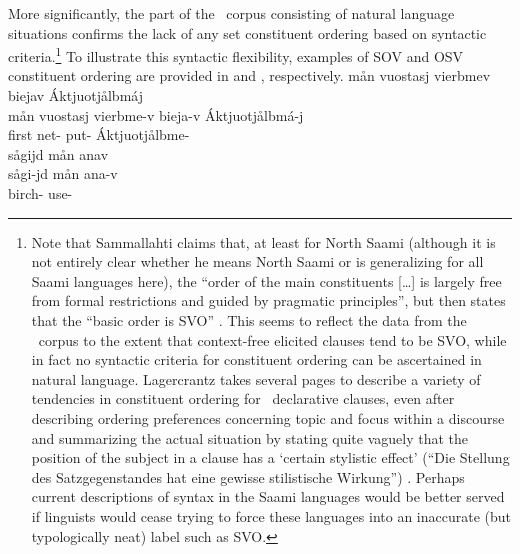 More significantly, the part of the \PS\ corpus consisting of natural language situations confirms the lack of any set constituent ordering based on syntactic criteria.\footnote{Note that Sammallahti claims that, at least for North Saami (although it is not entirely clear whether he means North Saami or is generalizing for all Saami languages here), the “order of the main constituents […] is largely free from formal restrictions and guided by pragmatic principles”, but then states that the “basic order is SVO” \citep[95]{Sammallahti1998}. This seems to reflect the data from the \PS\ corpus to the extent that context-free elicited clauses tend to be SVO, while in fact no syntactic criteria for constituent ordering can be ascertained in natural language. 
Lagercrantz takes several pages to describe a variety of tendencies in constituent ordering for \PS\ declarative clauses, even after describing ordering preferences concerning topic and focus within a discourse and summarizing the actual situation by stating quite vaguely that the position of the subject in a clause has a ‘certain stylistic effect’ (“Die Stellung des Satzgegenstandes hat eine gewisse stilistische Wirkung”) \citep[46]{Lagercrantz1926}. %
Perhaps current descriptions of syntax in the Saami languages would be better served if linguists %
would cease trying to force these languages into an inaccurate (but typologically neat) label such as SVO.} 
To illustrate this syntactic flexibility, examples of SOV and OSV %
constituent ordering are provided in  and , %
respectively.
\ea\label{deviantConstituentOrder1}
\glll	mån vuostasj vierbmev biejav Áktjuotjålbmáj \\
	mån vuostasj vierbme-v bieja-v Áktjuotjålbmá-j \\
	 first net- put- Áktjuotjålbme-\\\nopagebreak
{} 
\z
\ea\label{deviantConstituentOrder2}%
\glll	sågijd mån anav\\
	sågi-jd mån ana-v\\
	birch-  use- \\\nopagebreak
{} 
\z


